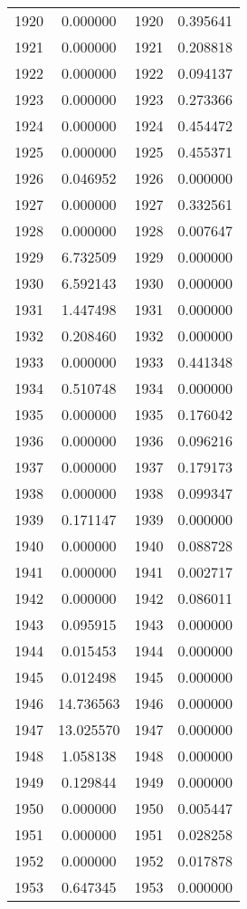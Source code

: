 \documentclass[12pt]{article}
\begin{document}
\begin{longtable}{@{}cccc@{}}
1920 & 0.000000 & 1920 & 0.395641 \\
1921 & 0.000000 & 1921 & 0.208818 \\
1922 & 0.000000 & 1922 & 0.094137 \\
1923 & 0.000000 & 1923 & 0.273366 \\
1924 & 0.000000 & 1924 & 0.454472 \\
1925 & 0.000000 & 1925 & 0.455371 \\
1926 & 0.046952 & 1926 & 0.000000 \\
1927 & 0.000000 & 1927 & 0.332561 \\
1928 & 0.000000 & 1928 & 0.007647 \\
1929 & 6.732509 & 1929 & 0.000000 \\
1930 & 6.592143 & 1930 & 0.000000 \\
1931 & 1.447498 & 1931 & 0.000000 \\
1932 & 0.208460 & 1932 & 0.000000 \\
1933 & 0.000000 & 1933 & 0.441348 \\
1934 & 0.510748 & 1934 & 0.000000 \\
1935 & 0.000000 & 1935 & 0.176042 \\
1936 & 0.000000 & 1936 & 0.096216 \\
1937 & 0.000000 & 1937 & 0.179173 \\
1938 & 0.000000 & 1938 & 0.099347 \\
1939 & 0.171147 & 1939 & 0.000000 \\
1940 & 0.000000 & 1940 & 0.088728 \\
1941 & 0.000000 & 1941 & 0.002717 \\
1942 & 0.000000 & 1942 & 0.086011 \\
1943 & 0.095915 & 1943 & 0.000000 \\
1944 & 0.015453 & 1944 & 0.000000 \\
1945 & 0.012498 & 1945 & 0.000000 \\
1946 & 14.736563 & 1946 & 0.000000 \\
1947 & 13.025570 & 1947 & 0.000000 \\
1948 & 1.058138 & 1948 & 0.000000 \\
1949 & 0.129844 & 1949 & 0.000000 \\
1950 & 0.000000 & 1950 & 0.005447 \\
1951 & 0.000000 & 1951 & 0.028258 \\
1952 & 0.000000 & 1952 & 0.017878 \\
1953 & 0.647345 & 1953 & 0.000000 \\

\end{longtable}
\end{document}
